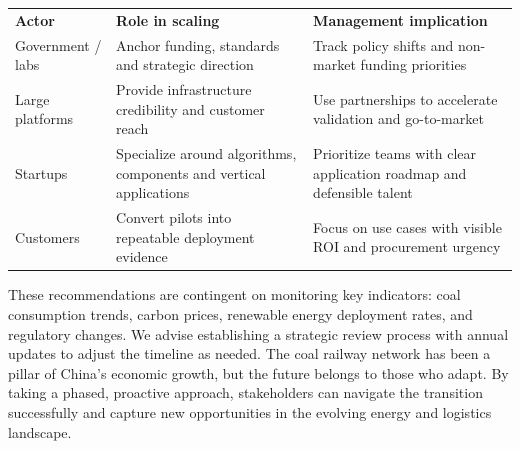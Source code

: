 \documentclass[10pt,a4paper]{article}
\begin{document}
\vspace{4pt}{\textcolor{BOBlue}{\scriptsize\bfseries ECOSYSTEM ROLE MAP}}\par
\begin{tabularx}{\linewidth}{p{33mm}YY}
\textcolor{BOBlue}{\bfseries Actor} & \textcolor{BOBlue}{\bfseries Role in scaling} & \textcolor{BOBlue}{\bfseries Management implication} \\
Government / labs & Anchor funding, standards and strategic direction & Track policy shifts and non-market funding priorities \\
Large platforms & Provide infrastructure credibility and customer reach & Use partnerships to accelerate validation and go-to-market \\
Startups & Specialize around algorithms, components and vertical applications & Prioritize teams with clear application roadmap and defensible talent \\
Customers & Convert pilots into repeatable deployment evidence & Focus on use cases with visible ROI and procurement urgency \\
\end{tabularx}

{\small {\small These recommendations are contingent on monitoring key indicators: coal consumption trends, carbon prices, renewable energy deployment rates, and regulatory changes. We advise establishing a strategic review process with annual updates to adjust the timeline as needed. The coal railway network has been a pillar of China's economic growth, but the future belongs to those who adapt. By taking a phased, proactive approach, stakeholders can navigate the transition successfully and capture new opportunities in the evolving energy and logistics landscape.}}
\end{document}
